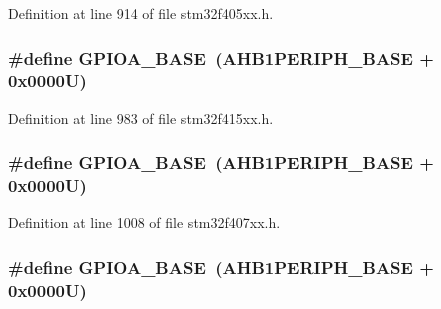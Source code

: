 Definition at line 914 of file stm32f405xx.\+h.

\subsubsection[{\texorpdfstring{G\+P\+I\+O\+A\+\_\+\+B\+A\+SE}{GPIOA_BASE}}]{\setlength{\rightskip}{0pt plus 5cm}\#define G\+P\+I\+O\+A\+\_\+\+B\+A\+SE~({\bf A\+H\+B1\+P\+E\+R\+I\+P\+H\+\_\+\+B\+A\+SE} + 0x0000\+U)}\hypertarget{group___peripheral__registers__structures_gad7723846cc5db8e43a44d78cf21f6efa}{}\label{group___peripheral__registers__structures_gad7723846cc5db8e43a44d78cf21f6efa}


Definition at line 983 of file stm32f415xx.\+h.

\subsubsection[{\texorpdfstring{G\+P\+I\+O\+A\+\_\+\+B\+A\+SE}{GPIOA_BASE}}]{\setlength{\rightskip}{0pt plus 5cm}\#define G\+P\+I\+O\+A\+\_\+\+B\+A\+SE~({\bf A\+H\+B1\+P\+E\+R\+I\+P\+H\+\_\+\+B\+A\+SE} + 0x0000\+U)}\hypertarget{group___peripheral__registers__structures_gad7723846cc5db8e43a44d78cf21f6efa}{}\label{group___peripheral__registers__structures_gad7723846cc5db8e43a44d78cf21f6efa}


Definition at line 1008 of file stm32f407xx.\+h.

\subsubsection[{\texorpdfstring{G\+P\+I\+O\+A\+\_\+\+B\+A\+SE}{GPIOA_BASE}}]{\setlength{\rightskip}{0pt plus 5cm}\#define G\+P\+I\+O\+A\+\_\+\+B\+A\+SE~({\bf A\+H\+B1\+P\+E\+R\+I\+P\+H\+\_\+\+B\+A\+SE} + 0x0000\+U)}\hypertarget{group___peripheral__registers__structures_gad7723846cc5db8e43a44d78cf21f6efa}{}\label{group___peripheral__registers__structures_gad7723846cc5db8e43a44d78cf21f6efa}


